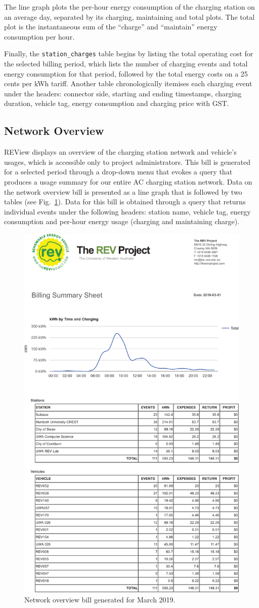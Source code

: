 The line graph plots the per-hour energy consumption of the charging station on an average day, separated by its charging, maintaining and total plots. The total plot is the instantaneous sum of the “charge” and “maintain” energy consumption per hour. 

Finally, the \texttt{station\_charges} table begins by listing the total operating cost for the selected billing period, which lists the number of charging events and total energy consumption for that period, followed by the total energy costs on a 25 cents per kWh tariff. Another table chronologically itemises each charging event under the headers: connector side, starting and ending timestamps, charging duration, vehicle tag, energy consumption and charging price with GST.

\subsection{Network Overview}
REView displays an overview of the charging station network and vehicle's usages, which is accessible only to project administrators. This bill is generated for a selected period through a drop-down menu that evokes a query that produces a usage summary for our entire AC charging station network. Data on the network overview bill is presented as a line graph that is followed by two tables (see Fig.~\ref{fig:9:sum}). Data for this bill is obtained through a query that returns individual events under the following headers: station name, vehicle tag, energy consumption and per-hour energy usage (charging and maintaining charge). 

\begin{figure}[H]
	\centering
	\includegraphics[width=0.5\linewidth]{bill-sum_1_crop}
	\caption{Network overview bill generated for March 2019.}
	\label{fig:9:sum}
\end{figure}

